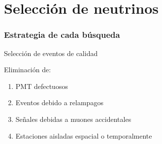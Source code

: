 \section[Selecci\'on $\nu$]{Selecci\'on de neutrinos}

\begin{frame}
 \frametitle{Estrategia de cada b\'usqueda}
 \begin{center}
 \end{center}
\end{frame}

\begin{frame}{Selecci\'on de eventos de calidad}
\begin{block}{Eliminaci\'on de:}
 \begin{enumerate}[<alert@+|+->]
  \item PMT defectuosos
  \item Eventos debido a relampagos
  \item Se\~nales debidas a muones accidentales
  \item Estaciones aisladas espacial o temporalmente
 \end{enumerate}
\end{block}


\end{frame}
